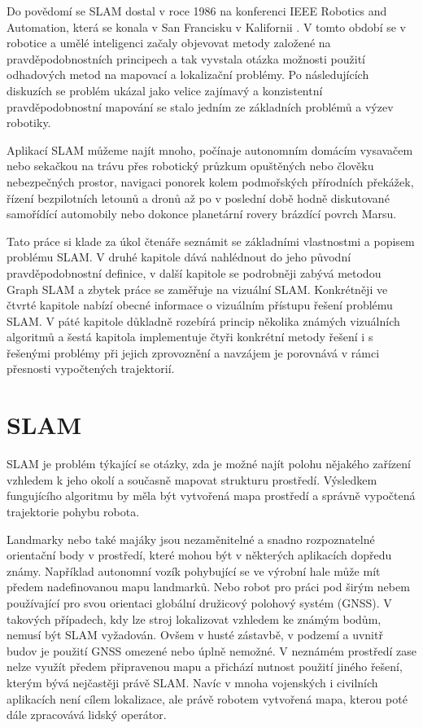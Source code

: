 \documentclass[12pt,a4paper]{report}
\begin{document}
Do povědomí se SLAM dostal v roce 1986 na konferenci IEEE Robotics and Automation, která se konala v San Francisku v Kalifornii \cite{Durrant-Whyte}. V tomto období se v robotice a umělé inteligenci začaly objevovat metody založené na pravděpodobnostních principech a tak vyvstala otázka možnosti použití odhadových metod na mapovací a lokalizační problémy. Po následujících diskuzích se problém ukázal jako velice zajímavý a konzistentní pravděpodobnostní mapování se stalo jedním ze základních problémů a výzev robotiky.

Aplikací SLAM můžeme najít mnoho, počínaje autonomním domácím vysavačem nebo sekačkou na trávu přes robotický průzkum opuštěných nebo člověku nebezpečných prostor, navigaci ponorek kolem podmořských přírodních překážek, řízení bezpilotních letounů a dronů až po v poslední době hodně diskutované samořídící automobily nebo dokonce planetární rovery brázdící povrch Marsu.

Tato práce si klade za úkol čtenáře seznámit se základními vlastnostmi a popisem problému SLAM. V druhé kapitole dává nahlédnout do jeho původní pravděpodobnostní definice, v další kapitole se podrobněji zabývá metodou Graph SLAM a zbytek práce se zaměřuje na vizuální SLAM. Konkrétněji ve čtvrté kapitole nabízí obecné informace o vizuálním přístupu řešení problému SLAM. V páté kapitole důkladně rozebírá princip několika známých vizuálních algoritmů a šestá kapitola implementuje čtyři konkrétní metody řešení i s řešenými problémy při jejich zprovoznění a navzájem je porovnává v rámci přesnosti vypočtených trajektorií. 




\chapter{SLAM}
SLAM je problém týkající se otázky, zda je možné najít polohu nějakého zařízení vzhledem k jeho okolí a současně mapovat strukturu prostředí. Výsledkem fungujícího algoritmu by měla být vytvořená mapa prostředí a správně vypočtená trajektorie pohybu robota.

Landmarky nebo také majáky jsou nezaměnitelné a snadno rozpoznatelné orientační body v prostředí, které mohou být v některých aplikacích dopředu známy. Například autonomní vozík pohybující se ve výrobní hale může mít předem nadefinovanou mapu landmarků. Nebo robot pro práci pod širým nebem používající pro svou orientaci globální družicový polohový systém (GNSS). V takových případech, kdy lze stroj lokalizovat vzhledem ke známým bodům, nemusí být SLAM vyžadován. Ovšem v husté zástavbě, v podzemí a uvnitř budov je použití GNSS omezené nebo úplně nemožné. V neznámém prostředí zase nelze využít předem připravenou mapu a přichází nutnost použití jiného řešení, kterým bývá nejčastěji právě SLAM. Navíc v mnoha vojenských i civilních aplikacích není cílem lokalizace, ale právě robotem vytvořená mapa, kterou poté dále zpracovává lidský operátor.
\end{document}
